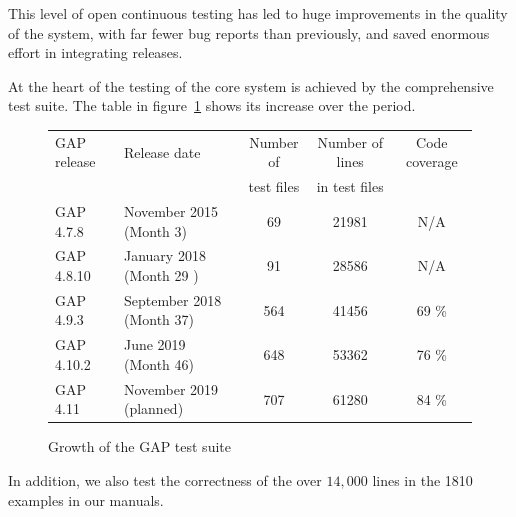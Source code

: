 This level of open continuous testing has led to huge improvements in
the quality of the system, with far fewer bug reports than previously,
and saved enormous effort in integrating releases.

At the heart of the testing of the core \GAP system is achieved by the
comprehensive test suite. The table in
figure~\ref{fig:test-suite-growth} shows its increase over the period.

\begin{figure}[!ht]
\begin{center}
\begin{tabular}{| l | l | c | c | c |} 
\hline
GAP release & Release date & Number of        & Number of lines & Code coverage \\
            &              & test files       & in test files   &               \\
\hline GAP 4.7.8  & November 2015 (Month 3)   & 69 & 21981 & N/A \\
\hline GAP 4.8.10 & January 2018 (Month 29 )  & 91 & 28586 & N/A \\
\hline GAP 4.9.3  & September 2018 (Month 37) & 564 & 41456 & 69 \% \\
\hline GAP 4.10.2 & June 2019 (Month 46)      & 648 & 53362 & 76 \% \\
\hline GAP 4.11   & November 2019 (planned)   & 707 & 61280 & 84 \% \\
\hline
\end{tabular}
\caption{Growth of the GAP test suite}\label{fig:test-suite-growth}
\end{center}
\end{figure}

In addition, we also test the correctness of the
over $14,000$ lines in the 1810 examples in our manuals.
%
%

